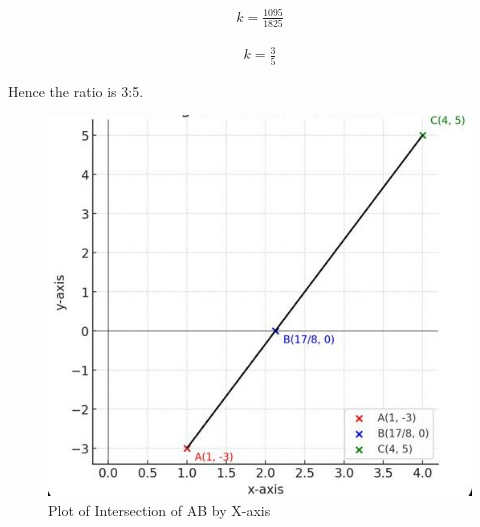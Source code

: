 \documentclass[journal,12pt,onecolumn]{IEEEtran}
\theoremstyle{remark}
\begin{document}
\begin{align}
    k = \frac{1095}{1825}
\end{align}

\begin{align}
    k = \frac{3}{5}
\end{align}

\centering
\begin{large}Hence the ratio is 3:5.\end{large}



\begin{figure}[H]
\centering
\includegraphics[width=0.8\columnwidth]{figs/graph.png}
 \caption*{Plot of Intersection of AB by X-axis}
\label{fig:graph.png}
\end{figure}
\end{document}
